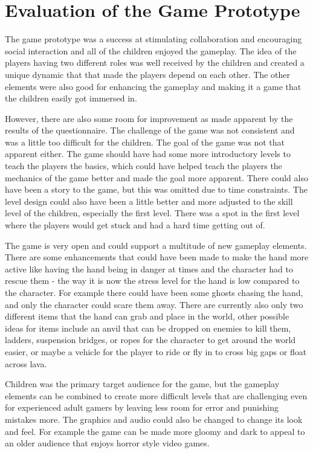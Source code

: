 \section{Evaluation of the Game Prototype}
\label{sec:eval_game}
The game prototype was a success at stimulating collaboration and encouraging social interaction and all of the children enjoyed the gameplay. The idea of the players having two different roles was well received by the children and created a unique dynamic that that made the players depend on each other. The other elements were also good for enhancing the gameplay and making it a game that the children easily got immersed in. 

However, there are also some room for improvement as made apparent by the results of the questionnaire. The challenge of the game was not consistent and was a little too difficult for the children. The goal of the game was not that apparent either. The game should have had some more introductory levels to teach the players the basics, which could have helped teach the players the mechanics of the game better and made the goal more apparent. There could also have been a story to the game, but this was omitted due to time constraints. The level design could also have been a little better and more adjusted to the skill level of the children, especially the first level. There was a spot in the first level where the players would get stuck and had a hard time getting out of.

The game is very open and could support a multitude of new gameplay elements. There are some enhancements that could have been made to make the hand more active like having the hand being in danger at times and the character had to rescue them - the way it is now the stress level for the hand is low compared to the character. For example there could have been some ghosts chasing the hand, and only the character could scare them away. There are currently also only two different items that the hand can grab and place in the world, other possible ideas for items include an anvil that can be dropped on enemies to kill them, ladders, suspension bridges, or ropes for the character to get around the world easier, or maybe a vehicle for the player to ride or fly in to cross big gaps or float across lava.

Children was the primary target audience for the game, but the gameplay elements can be combined to create more difficult levels that are challenging even for experienced adult gamers by leaving less room for error and punishing mistakes more. The graphics and audio could also be changed to change its look and feel. For example the game can be made more gloomy and dark to appeal to an older audience that enjoys horror style video games.

